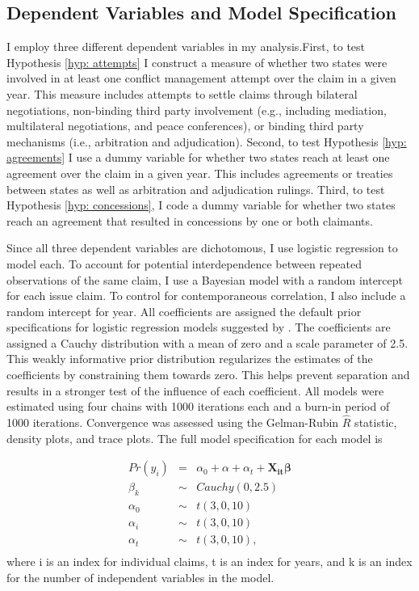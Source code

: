 \subsection{Dependent Variables and Model Specification}

I employ three different dependent variables in my analysis.First, to test Hypothesis \ref{hyp: attempts} I construct a measure of whether two states were involved in at least one conflict management attempt over the claim in a given year. This measure includes attempts to settle claims through bilateral negotiations, non-binding third party involvement (e.g., including mediation, multilateral negotiations, and peace conferences), or binding third party mechanisms (i.e., arbitration and adjudication). Second, to test Hypothesis \ref{hyp: agreements} I use a dummy variable for whether two states reach at least one agreement over the claim in a given year. This includes agreements or treaties between states as well as arbitration and adjudication rulings. Third, to test Hypothesis \ref{hyp: concessions}, I code a dummy variable for whether two states reach an agreement that resulted in concessions by one or both claimants.

Since all three dependent variables are dichotomous, I use logistic regression to model each. To account for potential interdependence between repeated observations of the same claim, I use a Bayesian model with a random intercept for each issue claim. To control for contemporaneous correlation, I also include a random intercept for year. All coefficients are assigned the default prior specifications for logistic regression models suggested by \citet{gelman2008}. The coefficients are assigned a Cauchy distribution with a mean of zero and a scale parameter of 2.5. This weakly informative prior distribution regularizes the estimates of the coefficients by constraining them towards zero. This helps prevent separation and results in a stronger test of the influence of each coefficient. All models were estimated using four chains with 1000 iterations each and a burn-in period of 1000 iterations. Convergence was assessed using the Gelman-Rubin $\hat{R}$ statistic, density plots, and trace plots. The full model specification for each model is

\begin{eqnarray*}
	Pr(y_i) &=& \alpha_0 + \alpha + \alpha_t + \mathbf{ X_{it} \beta} \\
	\beta_k &\sim& Cauchy(0, 2.5) \\
	\alpha_0 &\sim&t(3, 0, 10) \\
	\alpha_{i} &\sim&t(3, 0, 10) \\
	\alpha_{t} &\sim&t(3, 0, 10),  \\
\end{eqnarray*} where i is an index for individual claims, t is an index for years, and k is an index for the number of independent variables in the model. 
